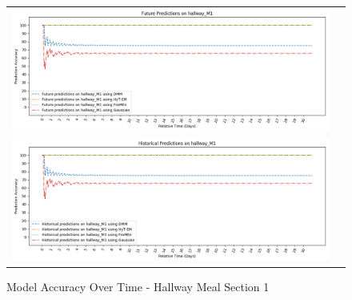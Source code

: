 \begin{center}
\begin{figure}[!Hp]
  \begin{tabular}{cc}
    {\includegraphics[width = 6in]{images/results/Future_Predictions_on_hallway_M1.png}} \\
    {\includegraphics[width = 6in]{images/results/Historical_Predictions_on_hallway_M1.png}} \\
  \end{tabular}
  \caption{Model Accuracy Over Time - Hallway Meal Section 1}
\end{figure}




\end{center}
